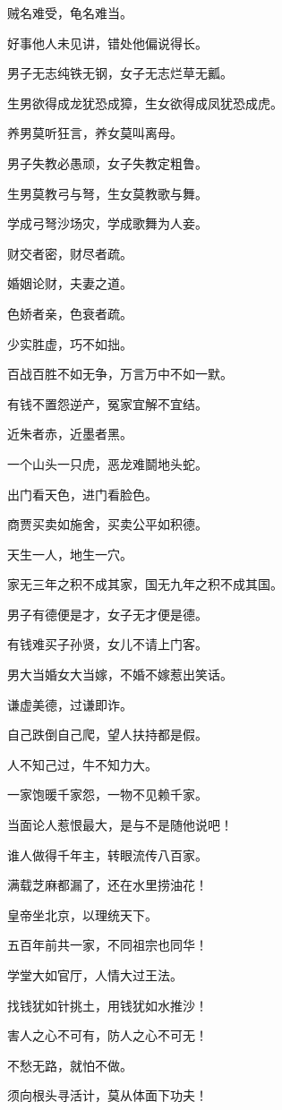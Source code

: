 \documentclass[12pt,oneside]{book}
\begin{document}
贼名难受，龟名难当。

好事他人未见讲，错处他偏说得长。

男子无志纯铁无钢，女子无志烂草无瓤。

生男欲得成龙犹恐成獐，生女欲得成凤犹恐成虎。

养男莫听狂言，养女莫叫离母。

男子失教必愚顽，女子失教定粗鲁。

生男莫教弓与弩，生女莫教歌与舞。

学成弓弩沙场灾，学成歌舞为人妾。

财交者密，财尽者疏。

婚姻论财，夫妻之道。

色娇者亲，色衰者疏。

少实胜虚，巧不如拙。

百战百胜不如无争，万言万中不如一默。

有钱不置怨逆产，冤家宜解不宜结。

近朱者赤，近墨者黑。

一个山头一只虎，恶龙难鬬地头蛇。

出门看天色，进门看脸色。

商贾买卖如施舍，买卖公平如积德。

天生一人，地生一穴。

家无三年之积不成其家，国无九年之积不成其国。

男子有德便是才，女子无才便是德。

有钱难买子孙贤，女儿不请上门客。

男大当婚女大当嫁，不婚不嫁惹出笑话。

谦虚美德，过谦即诈。

自己跌倒自己爬，望人扶持都是假。

人不知己过，牛不知力大。

一家饱暖千家怨，一物不见赖千家。

当面论人惹恨最大，是与不是随他说吧！

谁人做得千年主，转眼流传八百家。

满载芝麻都漏了，还在水里捞油花！

皇帝坐北京，以理统天下。

五百年前共一家，不同祖宗也同华！

学堂大如官厅，人情大过王法。

找钱犹如针挑土，用钱犹如水推沙！

害人之心不可有，防人之心不可无！

不愁无路，就怕不做。

须向根头寻活计，莫从体面下功夫！
\end{document}
